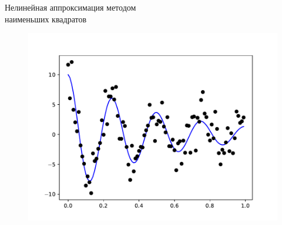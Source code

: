 \documentclass[aspectratio=169, mathserif]{beamer}	%
\begin{document}
\begin{frame}[fragile]{Нелинейная аппроксимация методом \\ наименьших квадратов}
\scriptsize
\begin{figure}[h!]
	\centering
	\includegraphics[width=.68\linewidth]{./pics/Figure_38}
\end{figure}
\vfil
\end{frame}
\end{document}
